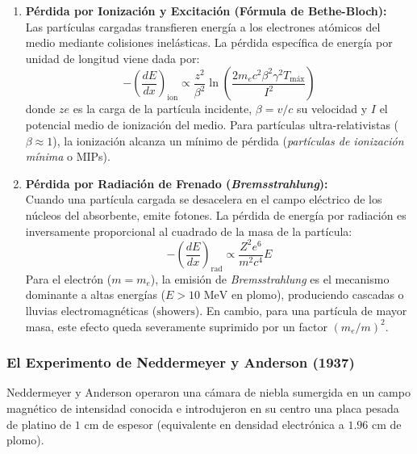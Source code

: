 \begin{enumerate}[label=\arabic*)]
    \item \textbf{Pérdida por Ionización y Excitación (Fórmula de Bethe-Bloch):} \\
    Las partículas cargadas transfieren energía a los electrones atómicos del medio mediante colisiones inelásticas. La pérdida específica de energía por unidad de longitud viene dada por:
    \begin{equation}
    -\left(\frac{dE}{dx}\right)_{\text{ion}} \propto \frac{z^2}{\beta^2} \ln \left( \frac{2 m_e c^2 \beta^2 \gamma^2 T_{\text{máx}}}{I^2} \right)
    \end{equation}
    donde $z e$ es la carga de la partícula incidente, $\beta = v/c$ su velocidad y $I$ el potencial medio de ionización del medio. Para partículas ultra-relativistas ($\beta \approx 1$), la ionización alcanza un mínimo de pérdida (\emph{partículas de ionización mínima} o MIPs).
    
    \item \textbf{Pérdida por Radiación de Frenado (\emph{Bremsstrahlung}):} \\
    Cuando una partícula cargada se desacelera en el campo eléctrico de los núcleos del absorbente, emite fotones. La pérdida de energía por radiación es inversamente proporcional al cuadrado de la masa de la partícula:
    \begin{equation}
    -\left(\frac{dE}{dx}\right)_{\text{rad}} \propto \frac{Z^2 e^6}{m^2 c^4} E
    \end{equation}
    Para el electrón ($m = m_e$), la emisión de \emph{Bremsstrahlung} es el mecanismo dominante a altas energías ($E > 10 \text{ MeV}$ en plomo), produciendo cascadas o lluvias electromagnéticas ($\text{showers}$). En cambio, para una partícula de mayor masa, este efecto queda severamente suprimido por un factor $(m_e/m)^2$.
\end{enumerate}

\newpage
\subsubsection{El Experimento de Neddermeyer y Anderson (1937)}

Neddermeyer y Anderson operaron una cámara de niebla sumergida en un campo magnético de intensidad conocida e introdujeron en su centro una placa pesada de platino de $1\text{ cm}$ de espesor (equivalente en densidad electrónica a $1.96\text{ cm}$ de plomo).

